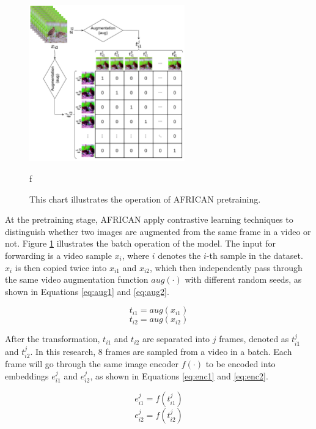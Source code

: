 \begin{figure}[ht]
    \centering
    \includegraphics[width=0.6\textwidth]{assets/imgs/3_3_ConstrastiveSimilarityMatrix}
    \caption[Operation of AFRICAN pretraining]{This chart illustrates the operation of AFRICAN pretraining.}
f\label{fig:modelstructafsim}
\end{figure}

At the pretraining stage, AFRICAN apply contrastive learning techniques to distinguish whether two images are augmented from the same frame in a video or not. Figure \ref{fig:modelstructafsim} illustrates the batch operation of the model. The input for forwarding is a video sample $x_i$, where $i$ denotes the $i$-th sample in the dataset. $x_i$ is then copied twice into $x_{i1}$ and $x_{i2}$, which then independently pass through the same video augmentation function $aug(\cdot)$ with different random seeds, as shown in Equations \ref{eq:aug1} and \ref{eq:aug2}. 

\begin{equation}
    \label{eq:aug1}
    t_{i1} = aug(x_{i1})
\end{equation}
\begin{equation}
    \label{eq:aug2}
    t_{i2} = aug(x_{i2})
\end{equation}

After the transformation, $t_{i1}$ and $t_{i2}$ are separated into $j$ frames, denoted as $t_{i1}^j$ and $t_{i2}^j$. In this research, 8 frames are sampled from a video in a batch. Each frame will go through the same image encoder $f(\cdot)$ to be encoded into embeddings $e_{i1}^j$ and $e_{i2}^j$, as shown in Equations \ref{eq:enc1} and \ref{eq:enc2}.

\begin{equation}
    \label{eq:enc1}
    e_{i1}^j = f(t_{i1}^j)
\end{equation}
\begin{equation}
    \label{eq:enc2}
    e_{i2}^j = f(t_{i2}^j)
\end{equation}

